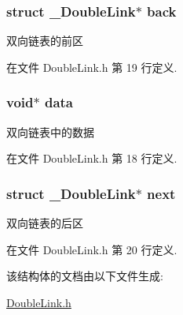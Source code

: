 \subsubsection[{back}]{\setlength{\rightskip}{0pt plus 5cm}struct {\bf \+\_\+\+Double\+Link}$\ast$ back}\label{struct___double_link_a958749bf22e72387e49a9acaf942687f}


双向链表的前区 



在文件 Double\+Link.\+h 第 19 行定义.

\hypertarget{struct___double_link_a735984d41155bc1032e09bece8f8d66d}{}
\subsubsection[{data}]{\setlength{\rightskip}{0pt plus 5cm}void$\ast$ data}\label{struct___double_link_a735984d41155bc1032e09bece8f8d66d}


双向链表中的数据 



在文件 Double\+Link.\+h 第 18 行定义.

\hypertarget{struct___double_link_a0efbf988904af75293c400185b0ea6b0}{}
\subsubsection[{next}]{\setlength{\rightskip}{0pt plus 5cm}struct {\bf \+\_\+\+Double\+Link}$\ast$ next}\label{struct___double_link_a0efbf988904af75293c400185b0ea6b0}


双向链表的后区 



在文件 Double\+Link.\+h 第 20 行定义.



该结构体的文档由以下文件生成\+:\begin{DoxyCompactItemize}
\item 
\hyperlink{_double_link_8h}{Double\+Link.\+h}\end{DoxyCompactItemize}
